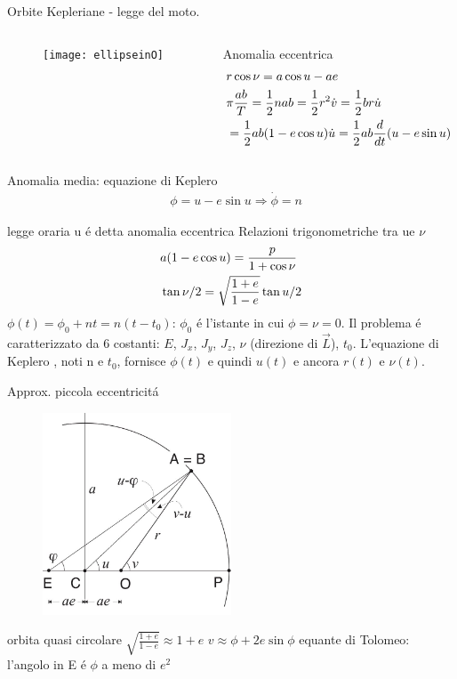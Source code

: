 \begin{frame}{Orbite Kepleriane - legge del moto.}
\begin{columns}
\begin{column}{0.2\textwidth}
\begin{figure}[!ht]
\texttt{[image: ellipseinO]}
\end{figure}
\end{column}
\begin{column}{0.8\textwidth}
\begin{block}{Anomalia eccentrica}
\begin{align*}
&r\cos{\nu}=a\cos{u}-ae\\
&\pi\frac{ab}{T}=\frac{1}{2}nab=\frac{1}{2}r^2\dot{v}=\frac{1}{2}br\dot{u}\\
&=\frac{1}{2}ab(1-e\cos{u})\dot{u}=\frac{1}{2}ab\frac{d}{d t}(u-e\sin{u})
\end{align*}
\end{block}
\end{column}
\end{columns}
\begin{block}{Anomalia media: equazione di Keplero}
\begin{align*}\label{eq:Keq}
&\phi=u-e\sin{u}\Rightarrow\dot{\phi}=n
\end{align*}
\end{block}
\end{frame}

\begin{wordonframe}{legge oraria}
u \'e detta anomalia eccentrica
Relazioni trigonometriche tra ue $\nu$
\begin{align*}
&a(1-e\cos{u})=\frac{p}{1+\cos{\nu}}\\
&\operatorname{tan}{\nu/2}=\sqrt{\frac{1+e}{1-e}}\operatorname{tan}{u/2}
\end{align*}
$\phi(t)=\phi_0+nt=n(t-t_0)$: $\phi_0$ \'e l'istante in cui $\phi=\nu=0$.
Il problema \'e caratterizzato da 6 costanti: $E$, $J_x$, $J_y$, $J_z$, $\nu$ (direzione di $\vec{L}$), $t_0$.
L'equazione di Keplero , noti n e $t_0$, fornisce $\phi(t)$ e quindi $u(t)$ e ancora $r(t)$ e $\nu(t)$.
\end{wordonframe}

\begin{frame}{Approx. piccola eccentricit\'a}
\begin{figure}[!ht]
\includegraphics[width=0.5\textwidth]{tolomeo}
\end{figure}
\end{frame}

\begin{wordonframe}{orbita quasi circolare}
$\sqrt{\frac{1+e}{1-e}}\approx1+e$
$v\approx\phi+2e\sin{\phi}$
equante di Tolomeo: l'angolo in E \'e $\phi$ a meno di $e^2$
\end{wordonframe}
